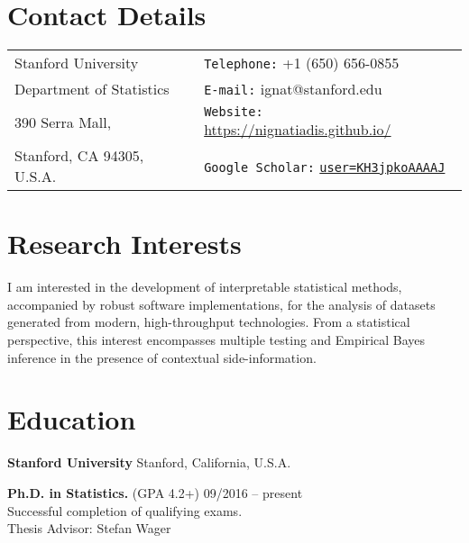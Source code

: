\documentclass[margin,line]{res}
\newcommand{\g}{\textgreek}
\newenvironment{list1}{
  \begin{list}{\ding{113}}{%
      \setlength{\itemsep}{0in}
      \setlength{\parsep}{0in} \setlength{\parskip}{0in}
      \setlength{\topsep}{0in} \setlength{\partopsep}{0in}
      \setlength{\leftmargin}{0.17in}}}{\end{list}}
\begin{document}

\begin{resume}
\section{\sc Contact Details}
\vspace{.05in}
\begin{tabular}{@{}p{2in}p{4in}}
Stanford University             & {\tt Telephone:}  +1 (650) 656-0855 \\
Department of Statistics   & {\tt E-mail:}    ignat@stanford.edu \\
390 Serra Mall, &  {\tt Website:} \url{https://nignatiadis.github.io/}\\
Stanford, CA 94305, U.S.A.  & {\tt Google Scholar:} \href{https://scholar.google.com/citations?user=KH3jpkoAAAAJ}{\tt user=KH3jpkoAAAAJ} \\
\end{tabular}



\section{\sc Research Interests}
I am interested in the development of interpretable statistical methods, accompanied by robust software implementations, for the analysis of datasets generated from modern, high-throughput technologies. From a statistical perspective, this interest encompasses multiple testing and Empirical Bayes inference in the presence of contextual side-information.

\section{\sc Education}
{\bf Stanford University} \hfill Stanford, California, U.S.A.\\
\vspace*{-.14in}
\begin{list1}
\item[]
\textbf{Ph.D. in Statistics.}  (GPA 4.2+) \hfill  09/2016 -- present\\
Successful completion of qualifying exams.\\
Thesis Advisor: Stefan Wager
\end{list1}


\end{resume}
\end{document}
